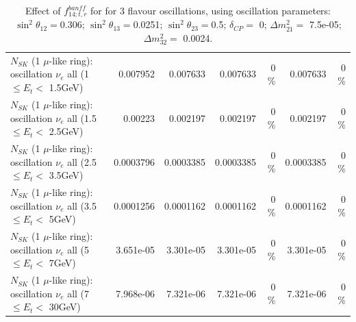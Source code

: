 \begin{table}
\begin{tabular}{| l | r | r | r  r | r  r |}
$N_{SK}$ (1 $\mu$-like ring): oscillation $\nu_{e}$ all (1 $\leq E_{t} <$ 1.5GeV) &        0.007952 &        0.007633 &        0.007633 &        0 \%  &        0.007633 &        0 \%  \\ 
$N_{SK}$ (1 $\mu$-like ring): oscillation $\nu_{e}$ all (1.5 $\leq E_{t} <$ 2.5GeV) &         0.00223 &        0.002197 &        0.002197 &        0 \%  &        0.002197 &        0 \%  \\ 
$N_{SK}$ (1 $\mu$-like ring): oscillation $\nu_{e}$ all (2.5 $\leq E_{t} <$ 3.5GeV) &       0.0003796 &       0.0003385 &       0.0003385 &        0 \%  &       0.0003385 &        0 \%  \\ 
$N_{SK}$ (1 $\mu$-like ring): oscillation $\nu_{e}$ all (3.5 $\leq E_{t} <$ 5GeV) &       0.0001256 &       0.0001162 &       0.0001162 &        0 \%  &       0.0001162 &        0 \%  \\ 
 $N_{SK}$ (1 $\mu$-like ring): oscillation $\nu_{e}$ all (5 $\leq E_{t} <$ 7GeV) &       3.651e-05 &       3.301e-05 &       3.301e-05 &        0 \%  &       3.301e-05 &        0 \%  \\ 
$N_{SK}$ (1 $\mu$-like ring): oscillation $\nu_{e}$ all (7 $\leq E_{t} <$ 30GeV) &       7.968e-06 &       7.321e-06 &       7.321e-06 &        0 \%  &       7.321e-06 &        0 \%  \\ 
\hline
\hline
\end{tabular}
\caption{ Effect of $f_{14; t, r}^{banff}$ for for 3 flavour oscillations, using oscillation parameters:  $\sin^2\theta_{12} = $0.306; $\sin^2\theta_{13} = $0.0251; $\sin^2\theta_{23} = $0.5; $\delta_{CP} = $        0; $\Delta m^2_{21} = $    7.5e-05; $\Delta m^2_{32} = $    0.0024. }
\label{tab:num_banff_14_1RmuT_3f_osc_t13:0.0251}
\end{table}
\clearpage
